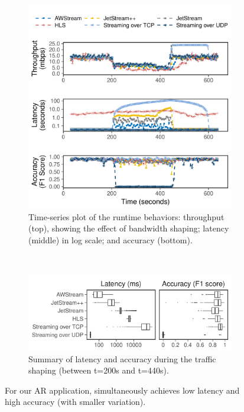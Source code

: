 \begin{figure}[t]
  \begin{subfigure}[t]{\columnwidth}
    \centering
    \includegraphics[width=\columnwidth]{figures/runtime_darknet-timeseries.pdf}
    \caption{Time-series plot of the runtime behaviors: throughput (top),
      showing the effect of bandwidth shaping; latency (middle) in log scale;
      and accuracy (bottom).}
    \label{fig:ar-runtime-timeseries}
  \end{subfigure}
  \vspace{0.2em}
  \\
  \begin{subfigure}[t]{\columnwidth}
    \centering
    \includegraphics[width=\columnwidth]{figures/runtime_darknet-boxplot.pdf}
    \caption{Summary of latency and accuracy during the traffic shaping (between
      t=200s and t=440s).}
    \label{fig:ar-runtime-boxplot}
  \end{subfigure}
  \caption{For our AR application, \sysname{} simultaneously achieves low
    latency and high accuracy (with smaller variation).}
  \label{fig:ar-runtime}
  \vspace{-1em}
\end{figure}

